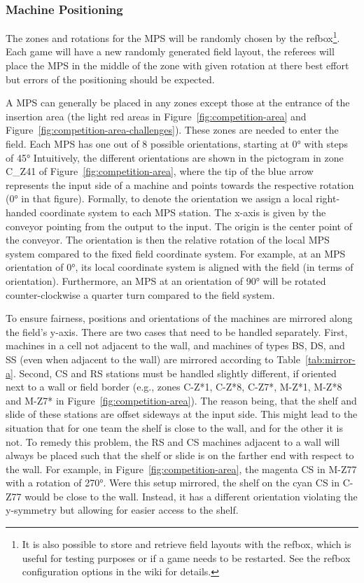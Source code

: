 \documentclass[12pt,twoside]{article}
\newcommand{\reffig}[1]{Figure~\ref{#1}}
\newcommand{\reftab}[1]{Table~\ref{#1}}
\begin{document}
\subsubsection{Machine Positioning}
\label{sec:machine-swapping}
The zones and rotations for the \ac{MPS} will be randomly chosen by the
\ac{refbox}\footnote{It is also possible to store and retrieve field layouts
  with the \ac{refbox}, which is useful for testing purposes or if a game needs
  to be restarted. See the \ac{refbox} configuration options in the wiki
for details.}.
Each game will have a new randomly generated field layout, the referees will
place the \ac{MPS} in the middle of the zone with given rotation at there
best effort but errors of the positioning should be expected.

A \ac{MPS} can generally  be placed in any zones except those at the
entrance of the insertion area (the light red areas in
\reffig{fig:competition-area} and \reffig{fig:competition-area-challenges}).
These zones are needed to enter the field. Each \ac{MPS} has one out of 8
possible orientations, starting at \ang{0} with steps of \ang{45}
Intuitively, the different orientations are shown in the pictogram in
zone C\_Z41 of \reffig{fig:competition-area}, where
the tip of the blue arrow represents the input side of a machine and points
towards the respective rotation (\ang{0} in that figure).
Formally, to denote
the orientation  we assign a local right-handed coordinate system to
each \ac{MPS} station. The x-axis is given by the conveyor pointing from
the output to the input. The origin is the center point of the
conveyor. The orientation is then the relative rotation of the local
\ac{MPS} system compared to the fixed field coordinate system. For example,
at an \ac{MPS} orientation of \ang{0}, its local coordinate system is
aligned with the field (in terms of orientation). Furthermore, an \ac{MPS}
at an orientation of \ang{90} will be rotated counter-clockwise a
quarter turn compared to the field system.

To ensure fairness, positions and orientations of the machines are mirrored
along the field's y-axis. There are two cases that need to be handled
separately. First, machines in a cell not adjacent to the wall, and machines of
types \ac{BS}, \ac{DS}, and \ac{SS} (even when adjacent to the wall) are
mirrored according to \reftab{tab:mirror-a}. Second, \ac{CS} and \ac{RS}
stations must be handled slightly different,
if oriented next to a wall or field border
(e.g., zones C-Z*1, C-Z*8, C-Z7*, M-Z*1, M-Z*8 and M-Z7* in
\reffig{fig:competition-area}).
The reason being, that the shelf and slide of these stations are
offset sideways at the input side. This might lead to the situation that for one
team the shelf is close to the wall, and for the other it is not. To remedy this
problem, the \ac{RS} and \ac{CS} machines adjacent to a wall will always
be placed such that the shelf or slide is on the farther end with respect
to the wall.
For example, in \reffig{fig:competition-area}, the magenta \ac{CS}
in M-Z77 with a rotation of \ang{270}. Were this setup mirrored, the shelf
on the cyan \ac{CS} in C-Z77 would be close to the wall.
Instead, it has a different orientation violating the y-symmetry
but allowing for easier access to the shelf.
\end{document}
